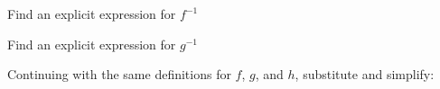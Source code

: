 \begin{ProblemSet}[pencil space=3.5in]
 \begin{Problem}
  Find an explicit expression for $f^{-1}$
 \end{Problem}
 \begin{Problem}
  Find an explicit expression for $g^{-1}$
 \end{Problem}
\end{ProblemSet}


\newpage
{}

Continuing with the same definitions for $f$, $g$, and $h$, substitute and simplify:

\begin{multicols}{2}
 \begin{ProblemSet}[pencil space=0in]
 \end{ProblemSet}
\end{multicols}

